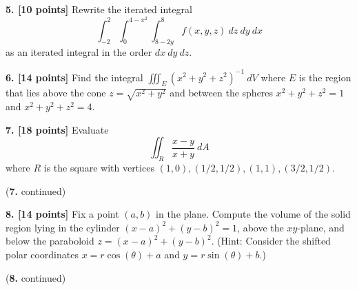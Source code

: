 \documentclass{article}
\begin{document}
\begin{spacing}{2}
\newpage 

\noindent \textbf{5. [10 points]} Rewrite the iterated integral 
\[
\int_{-2}^2 \int_{0}^{4-x^2} \int_{8-2y}^8 f(x,y,z) \: dz \:dy \:dx
\]
as an iterated integral in the order $dx \: dy \: dz$. 

\newpage 

\noindent \textbf{6. [14 points]} Find the integral $\iiint_E (x^2 + y^2 + z^2)^{-1} \: dV$ where $E$ is the region that lies above the cone $z = \sqrt{x^2 + y^2}$ and between the spheres $x^2 + y^2 + z^2 = 1$ and $x^2 + y^2 + z^2 = 4$. 

\newpage

\noindent \textbf{7. [18 points]} Evaluate 
\[
\iint_R \frac{x-y}{x+y} \: dA
\]
where $R$ is the square with vertices $(1,0), (1/2, 1/2), (1, 1), (3/2, 1/2)$. 

\newpage 

\noindent (\textbf{7.} continued)

\newpage 

\noindent \textbf{8. [14 points]} Fix a point $(a,b)$ in the plane. Compute the volume of the solid region lying in the cylinder $(x-a)^2 + (y-b)^2 = 1$, above the $xy$-plane, and below the paraboloid $z = (x-a)^2 + (y-b)^2$. (Hint: Consider the shifted polar coordinates $x = r\cos(\theta) + a$ and $y = r \sin(\theta) + b$.) 

\newpage 

\noindent (\textbf{8.} continued) 
\end{spacing}
\end{document}
